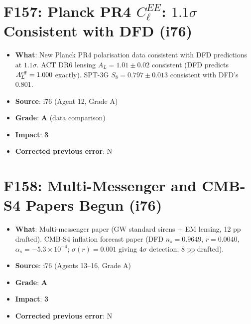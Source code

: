 \documentclass[11pt,a4paper]{article}
\newcommand{\grade}[1]{\textbf{#1}}
\newcommand{\impact}[1]{\textbf{#1}}
\begin{document}
\section{F157: Planck PR4 $C_\ell^{EE}$: $1.1\sigma$ Consistent with DFD (i76)}
\begin{itemize}[nosep]
\item \textbf{What}: New Planck PR4 polarisation data consistent with DFD predictions at $1.1\sigma$. ACT DR6 lensing $A_L = 1.01 \pm 0.02$ consistent (DFD predicts $A_L^{\rm eff} = 1.000$ exactly). SPT-3G $S_8 = 0.797 \pm 0.013$ consistent with DFD's $0.801$.
\item \textbf{Source}: i76 (Agent 12, Grade A)
\item \textbf{Grade}: \grade{A} (data comparison)
\item \textbf{Impact}: \impact{3}
\item \textbf{Corrected previous error}: N
\end{itemize}

\section{F158: Multi-Messenger and CMB-S4 Papers Begun (i76)}
\begin{itemize}[nosep]
\item \textbf{What}: Multi-messenger paper (GW standard sirens + EM lensing, 12 pp drafted). CMB-S4 inflation forecast paper (DFD $n_s = 0.9649$, $r = 0.0040$, $\alpha_s = -5.3 \times 10^{-4}$; $\sigma(r) = 0.001$ giving $4\sigma$ detection; 8 pp drafted).
\item \textbf{Source}: i76 (Agents 13--16, Grade A)
\item \textbf{Grade}: \grade{A}
\item \textbf{Impact}: \impact{3}
\item \textbf{Corrected previous error}: N
\end{itemize}

\end{document}
